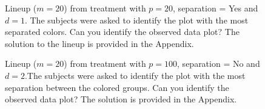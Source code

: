 %
\begin{figure}[hbtp]
   \centering
       \caption{Lineup  ($m=20$) from treatment with $p = 20$, separation = Yes and $d = 1$. The subjects were asked to identify the plot with the most separated colors. Can you identify the observed data plot? The solution to the lineup is provided in the Appendix. }
     \label{fig:test_category_1d}
\end{figure}


 
\begin{figure}[hbtp]
       \caption{Lineup  ($m=20$) from treatment with $p = 100$, separation = No and $d = 2$.The subjects were asked to identify the plot with the most separation between the colored groups. Can you identify the observed data plot? The solution is provided in the Appendix. }
       \label{fig:test_category}
\end{figure}

